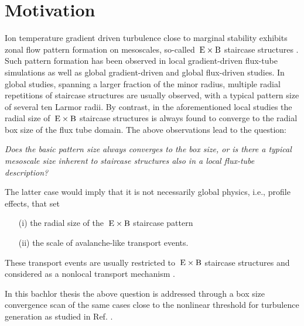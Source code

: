 
\chapter{Motivation}
\label{chap:motivation}

\thispagestyle{empty}
\newpage

Ion temperature gradient driven turbulence close to marginal stability exhibits zonal flow pattern formation on mesoscales, so-called $\mathrm{\:E}\times\mathrm{B}$ staircase structures \cite{Pradalier2010}.
Such pattern formation has been observed in local gradient-driven flux-tube simulations \cite{Peeters2016, Weikl2017, Rath2021} as well as global gradient-driven \cite{McMillan2009, Villard2013, Seo2022} and global flux-driven \cite{Pradalier2010, Pradalier2015, Wang2020, Kim2022, Kishimoto2023} studies. 
In global studies, spanning a larger fraction of the minor radius, multiple radial repetitions of staircase structures are usually observed, with a typical pattern size of several ten Larmor radii.
By contrast, in the aforementioned local studies the radial size of $\mathrm{\:E}\times\mathrm{B}$ staircase structures is always found to converge to the radial box size of the flux tube domain.
The above observations lead to the question: \bigskip


\textit{Does the basic pattern size always converges to the box size, or is there a typical mesoscale size inherent to staircase structures also in a local flux-tube description?}\bigskip

The latter case would imply that it is not necessarily global physics, i.e., profile effects, that set 
\begin{itemize}
	\item[(i)] the radial size of the $\mathrm{\:E}\times\mathrm{B}$ staircase pattern
	\item[(ii)] the scale of avalanche-like transport events.
\end{itemize}
These transport events are usually restricted to $\mathrm{\:E}\times\mathrm{B}$ staircase structures and considered as a nonlocal transport mechanism \cite{Pradalier2010}. \bigskip

In this bachlor thesis the above question is addressed through a box size convergence scan of the same cases close to the nonlinear threshold for turbulence generation as studied in Ref. .
